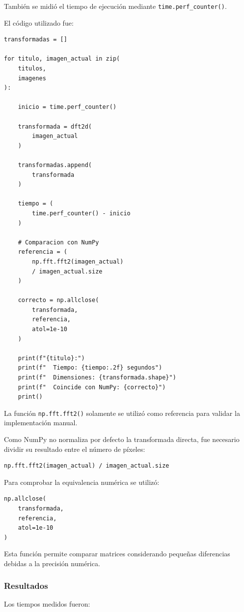 \documentclass[11pt,letterpaper]{article}
\begin{document}
También se midió el tiempo de ejecución
mediante \texttt{time.perf\_counter()}.

El código utilizado fue:

\begin{lstlisting}
transformadas = []

for titulo, imagen_actual in zip(
    titulos,
    imagenes
):

    inicio = time.perf_counter()

    transformada = dft2d(
        imagen_actual
    )

    transformadas.append(
        transformada
    )

    tiempo = (
        time.perf_counter() - inicio
    )

    # Comparacion con NumPy
    referencia = (
        np.fft.fft2(imagen_actual)
        / imagen_actual.size
    )

    correcto = np.allclose(
        transformada,
        referencia,
        atol=1e-10
    )

    print(f"{titulo}:")
    print(f"  Tiempo: {tiempo:.2f} segundos")
    print(f"  Dimensiones: {transformada.shape}")
    print(f"  Coincide con NumPy: {correcto}")
    print()
\end{lstlisting}

La función \texttt{np.fft.fft2()} solamente
se utilizó como referencia para validar
la implementación manual.

Como NumPy no normaliza por defecto la
transformada directa, fue necesario dividir
su resultado entre el número de píxeles:

\begin{lstlisting}
np.fft.fft2(imagen_actual) / imagen_actual.size
\end{lstlisting}

Para comprobar la equivalencia numérica
se utilizó:

\begin{lstlisting}
np.allclose(
    transformada,
    referencia,
    atol=1e-10
)
\end{lstlisting}

Esta función permite comparar matrices
considerando pequeñas diferencias debidas
a la precisión numérica.

\subsubsection*{Resultados}

Los tiempos medidos fueron:
\end{document}

